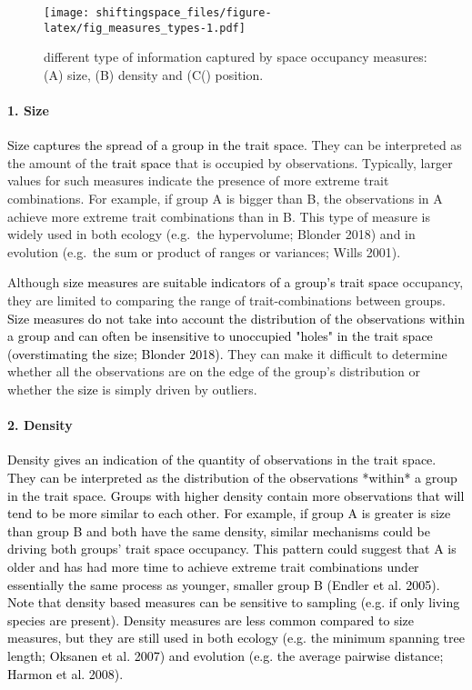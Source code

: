 \documentclass[]{article}
\let\oldparagraph\paragraph
\renewcommand{\paragraph}[1]{\oldparagraph{#1}\mbox{}}
\begin{document}
\begin{figure}
\centering
\texttt{[image: shiftingspace\_files/figure-latex/fig\_measures\_types-1.pdf]}
\caption{different type of information captured by space
occupancy measures: (A) size, (B) density and (C() position.}
\end{figure}

\renewcommand\baselinestretch{1.6}\selectfont

\paragraph{1. Size}\label{size}

\textcolor{black}{Size captures the spread of a group in the trait space}.
They can be interpreted as the amount of the
\textcolor{black}{trait space} that is occupied by
observations. Typically, larger values for such measures indicate the
presence of more extreme trait combinations. For example, if group A is
bigger than B, the observations in A achieve more extreme trait
combinations than in B. This type of measure is widely used in both
ecology (e.g.~the hypervolume; Blonder 2018) and in evolution (e.g.~the
sum or product of ranges or variances; Wills 2001).

Although
\textcolor{black}{size measures are suitable indicators of a group's trait space}
occupancy, they are limited to comparing the range of trait-combinations
between groups.
\textcolor{black}{Size measures do not take into account the distribution of the observations within a group and can often be insensitive to unoccupied "holes" in the trait space (overstimating the size; Blonder 2018).}
They can make it difficult to determine whether all the observations are
on the edge of the group's distribution or whether the
\textcolor{black}{size} is simply driven by outliers.

\paragraph{2. Density}\label{density}

\textcolor{black}{Density gives an indication of the quantity of observations in the trait space.
They can be interpreted as the distribution of the observations *within* a group in the trait space.
Groups with higher density contain more observations that will tend to be more similar to each other.
For example, if group A is greater is size than group B and both have the same density, similar mechanisms could be driving both groups' trait space occupancy. 
This pattern could suggest that A is older and has had more time to achieve extreme trait combinations under essentially the same process as younger, smaller group B (Endler et al. 2005).
Note that density based measures can be sensitive to sampling (e.g. if only living species are present).
Density measures are less common compared to size measures, but they are still used in both ecology (e.g. the minimum spanning tree length; Oksanen et al. 2007) and evolution (e.g. the average pairwise distance; Harmon et al. 2008). }
\end{document}
